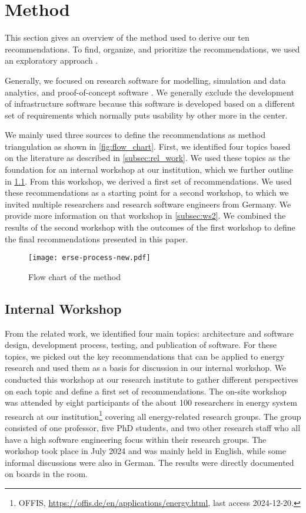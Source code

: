 \section{Method}
\label{sec:method}

This section gives an overview of the method used to derive our ten recommendations. To find, organize, and prioritize the recommendations, we used an exploratory approach \cite{harrison_inventor_2024}.

Generally, we focused on research software for modelling, simulation and data analytics, and proof-of-concept software \cite{hasselbring_toward_2024}. We generally exclude the development of infrastructure software 
because this software is developed based on a different set of requirements which normally puts usability by other more in the center. 

We mainly used three sources to define the recommendations as method triangulation \cite{carter_use_2014} as shown in \autoref{fig:flow_chart}. First, we identified four topics based on the literature as described in \autoref{subsec:rel_work}. We used these topics as the foundation for an internal workshop at our institution, which we further outline in \ref{subsec:ws1}. From this workshop, we derived a first set of recommendations. We used these recommendations as a starting point for a second workshop, to which we invited multiple researchers and research software engineers from Germany. We provide more information on that workshop in \ref{subsec:ws2}. We combined the results of the second workshop with the outcomes of the first workshop to define the final recommendations presented in this paper.

\begin{figure}[h]
  \centering
  \texttt{[image: erse-process-new.pdf]}
  \caption{Flow chart of the method}
  \label{fig:flow_chart}
\end{figure}

\subsection{Internal Workshop}
\label{subsec:ws1}
From the related work, we identified four main topics: architecture and software design, development process, testing, and publication of software. For these topics, we picked out the key recommendations that can be applied to energy research and used them as a basis for discussion in our internal workshop. We conducted this workshop at our research institute to gather different perspectives on each topic and define a first set of recommendations.
The on-site workshop was attended by eight participants of the about 100 researchers in energy system research at our
institution\footnote{OFFIS,  \url{https://offis.de/en/applications/energy.html}, last access 2024-12-20.}
covering all energy-related research groups. The group consisted of one professor, five PhD students, and two other research staff who all have a high software engineering focus within their research groups. The workshop took place in July 2024 and was mainly held in English, while some informal discussions were also in German. The results were directly documented on boards in the room.

